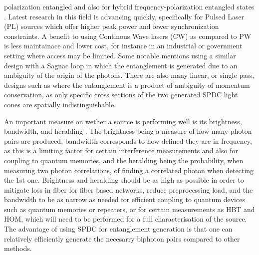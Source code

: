\documentclass{article}
\theoremstyle{mytheoremstyle}
\theoremstyle{mytheoremstyle}
\theoremstyle{myproblemstyle}
\begin{document}
polarization entangled \cite{L_Z_F_F_L_L_W_R_D_X_etal._2017} and also for hybrid frequency-polarization
entangled states \cite{F_R_D_F_L_M_A_B_D_2023}. Latest research in this field is advancing quickly, specifically for
Pulsed Laser (PL) sources which offer higher peak power and fewer synchronization constraints.
A benefit to using Continous Wave lasers (CW) as compared to PW is less maintainace and lower cost, for instance in an industrial or government
setting where access may be limited. Some notable mentions using a similar design with a Sagnac loop
\cite{Neumann_Buchner_Bulla_Bohmann_Ursin_2022_CW,Chen_Ecker_Wengerowsky_Bulla_Joshi_Steinlechner_Ursin_2018_CW}
in which the entanglement is generated due to an ambiguity of the origin of the photons.
There are also many linear, or single pass, designs such as \cite{Lee_Kim_Cha_Moon_2016,Kwiat_Mattle_Weinfurter_Zeilinger_Sergienko_Shih_1995}
where the entanglement is a product of ambiguity of momentum conservation, as only specific cross sections of the two generated SPDC light
cones are spatially indistinguishable.
\par An important measure on wether a source is performing well is its brightness, bandwidth, and heralding \cite{Bennink_2010,Ljunggren_Tengner_Marsden_Pelton_2006}.
The brightness being a measure of how many photon pairs are produced, bandwidth corresponds to how defined they are in frequency,
as this is a limiting factor for certain interference measurements and also for coupling to quantum memories,
and the heralding being the probability, when measuring two photon correlations, of finding a correlated photon when detecting the 1st one.
Brightness and heralding should be as high as possible in order to mitigate loss in fiber for fiber based networks,
reduce preprocessing load, and the bandwidth to be as narrow as needed for efficient coupling to quantum devices such as quantum memories or repeaters,
or for certain measurements as HBT and HOM, which will need to be performed for a full characterisation of the source.
The advantage of using SPDC for entanglement generation is that one can relatively efficiently generate the necesarry biphoton pairs
compared to other methods. 
\end{document}
